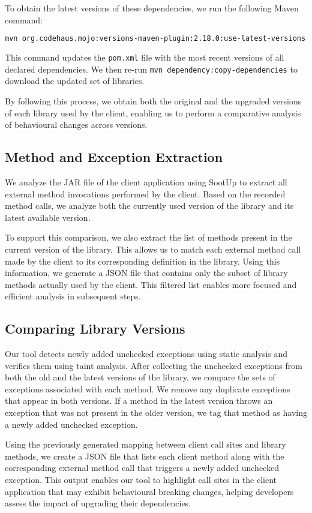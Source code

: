 To obtain the latest versions of these dependencies, we run the following Maven command:
\begin{lstlisting}[language=bash, breaklines=true, basicstyle=\ttfamily\small]
mvn org.codehaus.mojo:versions-maven-plugin:2.18.0:use-latest-versions
\end{lstlisting}
This command updates the \texttt{pom.xml} file with the most recent versions of all declared dependencies. We then re-run \texttt{mvn dependency:copy-dependencies} to download the updated set of libraries.

By following this process, we obtain both the original and the upgraded versions of each library used by the client, enabling us to perform a comparative analysis of behavioural changes across versions.

\subsection{Method and Exception Extraction}

We analyze the JAR file of the client application using SootUp to extract all external method invocations performed by the client. Based on the recorded method calls, we analyze both the currently used version of the library and its latest available version.

To support this comparison, we also extract the list of methods present in the current version of the library. This allows us to match each external method call made by the client to its corresponding definition in the library. Using this information, we generate a JSON file that contains only the subset of library methods actually used by the client. This filtered list enables more focused and efficient analysis in subsequent steps.

\subsection{Comparing Library Versions}

Our tool detects newly added unchecked exceptions using static analysis and verifies them using taint analysis. After collecting the unchecked exceptions from both the old and the latest versions of the library, we compare the sets of exceptions associated with each method. We remove any duplicate exceptions that appear in both versions. If a method in the latest version throws an exception that was not present in the older version, we tag that method as having a newly added unchecked exception.

Using the previously generated mapping between client call sites and library methods, we create a JSON file that lists each client method along with the corresponding external method call that triggers a newly added unchecked exception. This output enables our tool to highlight call sites in the client application that may exhibit behavioural breaking changes, helping developers assess the impact of upgrading their dependencies.
